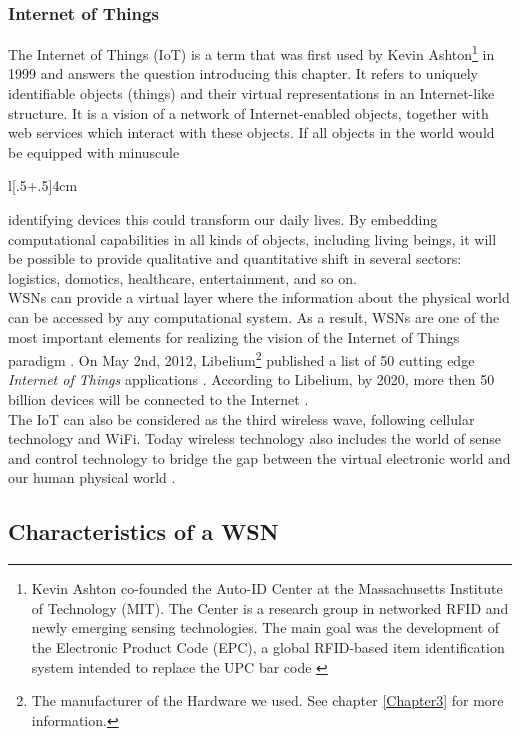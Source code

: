 \subsubsection{Internet of Things}
The Internet of Things (IoT) is a term that was first used by Kevin Ashton\footnote{Kevin Ashton co-founded the Auto-ID Center at the  Massachusetts Institute of Technology (MIT). The Center is a research group in networked RFID and newly emerging sensing technologies. The main goal was the development of the Electronic Product Code (EPC), a global RFID-based item identification system intended to replace the UPC bar code \citep{AUTO}} in 1999 and answers the question introducing this chapter. It refers to uniquely identifiable objects (things) and their virtual representations in an Internet-like structure. It is a vision of a network of Internet-enabled objects, together with web services which interact with these objects. If all objects in the world would be equipped with minuscule \begin{wrapfigure}[9]{l}[\dimexpr.5\width+.5\columnsep\relax]{4cm}
\vfill
\end{wrapfigure}identifying devices this could transform our daily lives. By embedding computational capabilities in all kinds of objects, including living beings, it will be possible to provide qualitative and quantitative shift in several sectors: logistics, domotics, healthcare, entertainment, and so on.\\
WSNs can provide a virtual layer where the information about the physical world can be accessed by any computational system. As a result, WSNs are one of the most important elements for realizing the vision of the Internet of Things paradigm \citep{ALCA}. On May 2nd, 2012, Libelium\footnote{The manufacturer of the Hardware we used. See chapter \ref{Chapter3} for more information.} published a list of 50 cutting edge \emph{Internet of Things} applications . According to Libelium, by 2020, more then 50 billion devices will be connected to the Internet \citep{50}.\\
The IoT can also be considered as the third wireless wave, following cellular technology and WiFi. Today wireless technology also includes the world of sense and control technology to bridge the gap between the virtual electronic world and our human physical world \citep{ATLANTIC}.
\subsection{Characteristics of a WSN}

